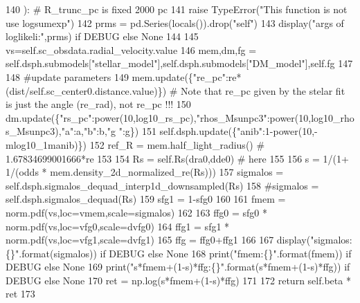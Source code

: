 \begin{DoxyCode}
140     ): \textcolor{comment}{# R\_trunc\_pc is fixed 2000 pc}
141         \textcolor{keywordflow}{raise} TypeError(\textcolor{stringliteral}{"This function is not use logsumexp"})
142         prms = pd.Series(locals()).drop(\textcolor{stringliteral}{"self"})
143         display(\textcolor{stringliteral}{"args of loglikeli:"},prms) \textcolor{keywordflow}{if} DEBUG \textcolor{keywordflow}{else} \textcolor{keywordtype}{None}
144         
145         vs=self.sc\_obsdata.radial\_velocity.value
146         mem,dm,fg = self.dsph.submodels[\textcolor{stringliteral}{"stellar\_model"}],self.dsph.submodels[\textcolor{stringliteral}{"DM\_model"}],self.fg
147         
148         \textcolor{comment}{#update parameters}
149         mem.update(\{\textcolor{stringliteral}{"re\_pc"}:re*(dist/self.sc\_center0.distance.value)\}) \textcolor{comment}{# Note that re\_pc given by the
       stelar fit is just the angle (re\_rad), not re\_pc !!!}
150         dm.update(\{\textcolor{stringliteral}{"rs\_pc"}:power(10,log10\_rs\_pc),\textcolor{stringliteral}{"rhos\_Msunpc3"}:power(10,log10\_rhos\_Msunpc3),\textcolor{stringliteral}{"a"}:a,\textcolor{stringliteral}{"b"}:b,\textcolor{stringliteral}{"g
      "}:g\})
151         self.dsph.update(\{\textcolor{stringliteral}{"anib"}:1-power(10,-mlog10\_1manib)\})
152         ref\_R = mem.half\_light\_radius() \textcolor{comment}{# 1.67834699001666*re}
153         
154         Rs = self.Rs(dra0,dde0) \textcolor{comment}{# here }
155         
156         s = 1/(1+ 1/(odds * mem.density\_2d\_normalized\_re(Rs)))
157         sigmalos = self.dsph.sigmalos\_dequad\_interp1d\_downsampled(Rs)
158         \textcolor{comment}{#sigmalos = self.dsph.sigmalos\_dequad(Rs)}
159         sfg1 = 1-sfg0
160         
161         fmem = norm.pdf(vs,loc=vmem,scale=sigmalos)
162         
163         ffg0 = sfg0 * norm.pdf(vs,loc=vfg0,scale=dvfg0)
164         ffg1 = sfg1 * norm.pdf(vs,loc=vfg1,scale=dvfg1)
165         ffg = ffg0+ffg1
166         
167         display(\textcolor{stringliteral}{"sigmalos:\{\}"}.format(sigmalos)) \textcolor{keywordflow}{if} DEBUG \textcolor{keywordflow}{else} \textcolor{keywordtype}{None}
168         print(\textcolor{stringliteral}{"fmem:\{\}"}.format(fmem)) \textcolor{keywordflow}{if} DEBUG \textcolor{keywordflow}{else} \textcolor{keywordtype}{None}
169         print(\textcolor{stringliteral}{"s*fmem+(1-s)*ffg:\{\}"}.format(s*fmem+(1-s)*ffg)) \textcolor{keywordflow}{if} DEBUG \textcolor{keywordflow}{else} \textcolor{keywordtype}{None}
170         ret = np.log(s*fmem+(1-s)*ffg)
171         
172         \textcolor{keywordflow}{return} self.beta * ret
173 
\end{DoxyCode}
